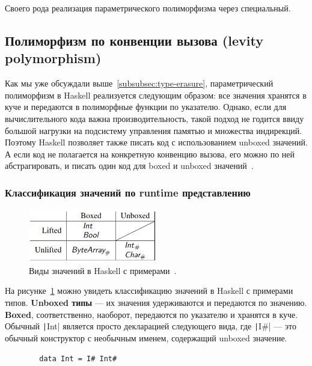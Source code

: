 \documentclass[12pt]{article}
\newcommand{\vocab}[1]{\textbf{#1}} %
\begin{document}
    Своего рода реализация параметрического полиморфизма через специальный.

    \subsection{Полиморфизм по конвенции вызова (levity polymorphism)} \label{subsec:levity-polymorphism}

    Как мы уже обсуждали выше~\ref{subsubsec:type-erasure}, параметрический полиморфизм в Haskell реализуется следующим образом: все значения хранятся в куче и передаются в полиморфные функции по указателю.
    Однако, если для вычислительного кода важна производительность, такой подход не годится ввиду большой нагрузки на подсистему управления памятью и множества индирекций.
    Поэтому Haskell позволяет также писать код с использованием unboxed значений.
    А если код не полагается на конкретную конвенцию вызова, его можно по ней абстрагировать, и писать один код для boxed и unboxed значений~\cite{eisenberg2017levity}.

    \subsubsection{Классификация значений по runtime представлению}

    \begin{figure}
        \centering
        \includegraphics[width=0.5\textwidth]{figs/haskell-value-kinds}
        \caption{Виды значений в Haskell с примерами~\cite{eisenberg2017levity}.}
        \label{fig:haskell-value-kinds}
    \end{figure}

    На рисунке~\ref{fig:haskell-value-kinds} можно увидеть классификацию значений в Haskell с примерами типов.
    \vocab{Unboxed типы} --- их значения удерживаются и передаются по значению.
    \vocab{Boxed}, соответственно, наоборот, передаются по указателю и хранятся в куче.
    Обычный \texttt|Int| является просто декларацией следующего вида, где \texttt|I#| --- это обычный конструктор с необычным именем, содержащий unboxed значение.
    \begin{verbatim}
        data Int = I# Int#
    \end{verbatim}
\end{document}
